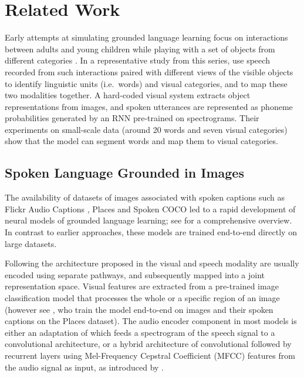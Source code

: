 \section{Related Work}
\label{sec:related}

Early attempts at simulating grounded language learning focus on
interactions between adults and young children while playing with a
set of objects from different categories \cite{roy1999learning,roy2002learning,
  gorniak2003visually,mukherjee2003visual}. In a representative study
from this series, \citet{roypentland2002learning} use speech recorded from
such interactions paired with different views of the visible objects
to identify linguistic units (i.e.\ words) and visual categories, and
to map these two modalities together. A hard-coded visual system
extracts object representations from images, and spoken utterances are
represented as phoneme probabilities generated by an RNN pre-trained on
spectrograms.  Their experiments on small-scale data (around 20 words
and seven visual categories) show that the model can segment words and
map them to visual categories.

\subsection{Spoken Language Grounded in Images}
\label{sec:images}
The availability of datasets of images associated with spoken captions
such as Flickr Audio Captions \cite{harwath2015deep}, Places
\cite{zhou2014learning} and Spoken COCO \cite{hsu2019transfer} led to
a rapid development of neural models of grounded language learning; see
\citet{chrupala-visually-2021} for a comprehensive overview. In contrast to 
earlier approaches, these models are trained end-to-end directly on
large datasets.

Following the architecture proposed in \citet{karpathy2014deep} the visual and 
speech modality are usually encoded using separate pathways, and subsequently 
mapped into a joint representation space.
Visual features are extracted from a pre-trained
image classification model that processes the whole or a specific
region of an image (however see \citet{harwath2018jointly}, who train the
model end-to-end on images and their spoken captions on the Places
dataset). The audio encoder component in most models is 
either an adaptation of \citet{harwath2016unsupervised} which feeds a
spectrogram of the speech signal to a convolutional architecture, or a
hybrid architecture of convolutional followed by recurrent layers using
Mel-Frequency Cepstral Coefficient (MFCC) features from the audio
signal as input, as introduced by \citet{chrupala-etal-2017-representations}.


